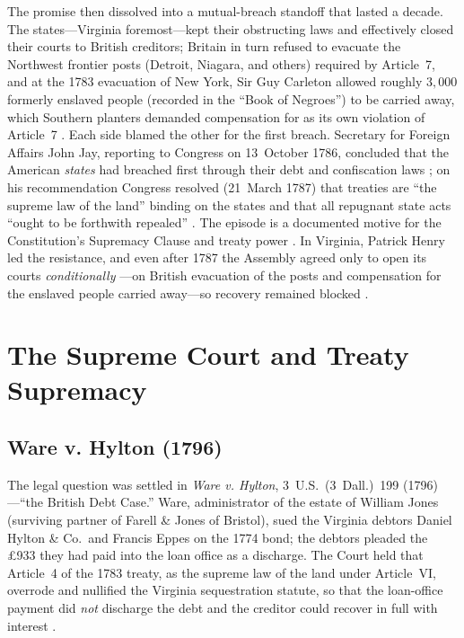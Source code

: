 \documentclass[12pt]{article}
\begin{document}
The promise then dissolved into a mutual-breach standoff that lasted a decade. The
states---Virginia foremost---kept their obstructing laws and effectively closed
their courts to British creditors; Britain in turn refused to evacuate the
Northwest frontier posts (Detroit, Niagara, and others) required by Article~7,
and at the 1783 evacuation of New York, Sir Guy Carleton allowed roughly $3{,}000$
formerly enslaved people (recorded in the ``Book of Negroes'') to be carried away,
which Southern planters demanded compensation for as its own violation of
Article~7 \citep{ritcheson1969aftermath}. Each side blamed the other for the first
breach. Secretary for Foreign Affairs John Jay, reporting to Congress on
13~October 1786, concluded that the American \emph{states} had breached
first through their debt and confiscation laws \citep{jayreport1786}; on his
recommendation Congress resolved (21~March 1787) that treaties are ``the supreme
law of the land'' binding on the states and that all repugnant state acts ``ought
to be forthwith repealed'' \citep{congress1787resolve}. The episode is a
documented motive for the Constitution's Supremacy Clause and treaty power
\citep{edling2003revolution}. In Virginia, Patrick Henry led the resistance, and
even after 1787 the Assembly agreed only to open its courts \emph{conditionally}
---on British evacuation of the posts and compensation for the enslaved people
carried away---so recovery remained blocked
\citep{madison1784resolutions, encvirginia_treaty}.

\section{The Supreme Court and Treaty Supremacy}
\label{sec:court}

\subsection{Ware v. Hylton (1796)}

The legal question was settled in \emph{Ware v. Hylton}, 3~U.S.\ (3~Dall.)\ 199
(1796)---``the British Debt Case.'' Ware, administrator of the estate of William
Jones (surviving partner of Farell \& Jones of Bristol), sued the Virginia debtors
Daniel Hylton \& Co.\ and Francis Eppes on the 1774 bond; the debtors pleaded the
\pounds933 they had paid into the loan office as a discharge. The Court held that
Article~4 of the 1783 treaty, as the supreme law of the land under Article~VI,
overrode and nullified the Virginia sequestration statute, so that the loan-office
payment did \emph{not} discharge the debt and the creditor could recover in full
with interest \citep{warevhylton1796}.
\end{document}
